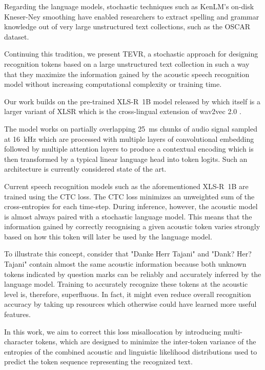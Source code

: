 Regarding the language models, stochastic techniques such as KenLM's on-disk Kneser-Ney smoothing \citep{kenlm,kenlm-smoothing} have enabled researchers to extract spelling and grammar knowledge out of very large unstructured text collections, such as the OSCAR dataset.

Continuing this tradition, we present TEVR, a stochastic approach for designing recognition tokens based on a large unstructured text collection in such a way that they maximize the information gained by the acoustic speech recognition model without increasing computational complexity or training time.

Our work builds on the pre-trained XLS-R~1B model released by \citet{xlsr_1B_2021}
which itself is a larger variant of XLSR \citep{xlsr_2020}
which is the cross-lingual extension of wav2vec 2.0 \citep{wav2vec2_2020}. 

The model works on partially overlapping 25~ms chunks of audio signal sampled at 16~kHz
which are processed with multiple layers of convolutional embedding 
followed by multiple attention layers to produce a contextual encoding
which is then transformed by a typical linear language head into token logits.
Such an architecture is currently considered state of the art.

Current speech recognition models such as the aforementioned XLS-R~1B are trained using the CTC loss.
The CTC loss minimizes an unweighted sum of the cross-entropies for each time-step. During inference, however, the acoustic model is almost always paired with a stochastic language model. This means that the information gained by correctly recognising a given acoustic token varies strongly based on how this token will later be used by the language model.

To illustrate this concept, consider that "Danke Herr Tajani" and "Dank? Her? Tajani" contain almost the same acoustic information because both unknown tokens indicated by question marks can be reliably and accurately inferred by the language model. Training to accurately recognize these tokens at the acoustic level is, therefore, superfluous. In fact, it might even reduce overall recognition accuracy by taking up resources which otherwise could have learned more useful features. 

In this work, we aim to correct this loss misallocation by introducing multi-character tokens, which are designed to minimize the inter-token variance of the entropies of the combined acoustic and linguistic likelihood distributions used to predict the token sequence representing the recognized text.

